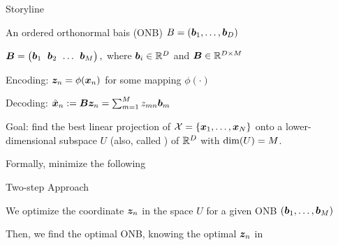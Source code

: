 \documentclass[handout,fleqn,aspectratio=169]{beamer}
\begin{document}
\begin{frame}{Storyline}

\plitemsep 0.07in

\bci

\item An ordered orthonormal bais (ONB) $B=(\bm{b}_1, \ldots, \bm{b}_D)$
\item $\mB = \rowvec{\vb_1 & \vb_2 & \ldots & \vb_M},$ where $\bm{b}_i \in {\mathbb R}^{D}$ and $\bm{B} \in {\mathbb R}^{D \times M}$
\item Encoding: $\bm{z}_n = \phi(\bm{x}_n)$ for some mapping $\phi(\cdot)$ 
\item Decoding: $\tilde{\bm{x}}_n := \bm{B} \bm{z}_n = \sum_{m=1}^M z_{mn}\bm{b}_m$
\item Goal: find the best linear projection of $\mathcal X=\{\bm{x}_1, \ldots, \bm{x}_N \}$ onto a lower-dimensional subspace $U$ (also, called ) of ${\mathbb R}^{D}$ with $\text{dim}(U)=M$.
\item Formally, minimize the following 
\eci
\end{frame}

\begin{frame}{Two-step Approach}

\plitemsep 0.2in

\bce[\bf Step 1.]

\item We optimize the coordinate $\bm{z}_n$ in the space $U$ for a given ONB $(\bm{b}_1, \ldots, \bm{b}_M)$

\item Then, we find the optimal ONB, knowing the optimal $\bm{z}_n$ in 
\ece
\end{frame}
\end{document}
